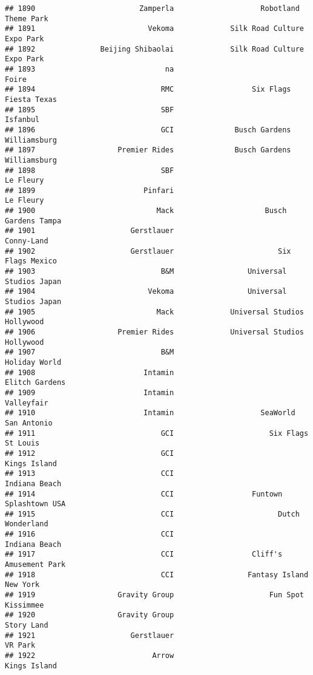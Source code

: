 \documentclass[
]{article}
\begin{document}
\begin{verbatim}
## 1890                        Zamperla                    Robotland Theme Park
## 1891                          Vekoma             Silk Road Culture Expo Park
## 1892               Beijing Shibaolai             Silk Road Culture Expo Park
## 1893                              na                                   Foire
## 1894                             RMC                  Six Flags Fiesta Texas
## 1895                             SBF                                Isfanbul
## 1896                             GCI              Busch Gardens Williamsburg
## 1897                   Premier Rides              Busch Gardens Williamsburg
## 1898                             SBF                               Le Fleury
## 1899                         Pinfari                               Le Fleury
## 1900                            Mack                     Busch Gardens Tampa
## 1901                      Gerstlauer                              Conny-Land
## 1902                      Gerstlauer                        Six Flags Mexico
## 1903                             B&M                 Universal Studios Japan
## 1904                          Vekoma                 Universal Studios Japan
## 1905                            Mack             Universal Studios Hollywood
## 1906                   Premier Rides             Universal Studios Hollywood
## 1907                             B&M                           Holiday World
## 1908                         Intamin                          Elitch Gardens
## 1909                         Intamin                              Valleyfair
## 1910                         Intamin                    SeaWorld San Antonio
## 1911                             GCI                      Six Flags St Louis
## 1912                             GCI                            Kings Island
## 1913                             CCI                           Indiana Beach
## 1914                             CCI                  Funtown Splashtown USA
## 1915                             CCI                        Dutch Wonderland
## 1916                             CCI                           Indiana Beach
## 1917                             CCI                  Cliff's Amusement Park
## 1918                             CCI                 Fantasy Island New York
## 1919                   Gravity Group                      Fun Spot Kissimmee
## 1920                   Gravity Group                              Story Land
## 1921                      Gerstlauer                                 VR Park
## 1922                           Arrow                            Kings Island

\end{verbatim}
\end{document}

